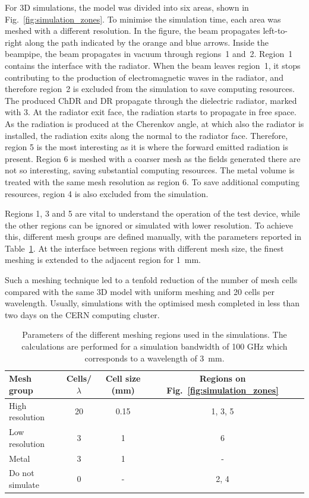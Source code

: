 For 3D simulations, the model was divided into six areas, shown in Fig.~\ref{fig:simulation_zones}. To minimise the simulation time, each area was meshed with a different resolution. In the figure, the beam propagates left-to-right along the path indicated by the orange and blue arrows. Inside the beampipe, the beam propagates in vacuum through regions~1 and~2. Region~1 contains the interface with the radiator. When the beam leaves region~1, it stops contributing to the production of electromagnetic waves in the radiator, and therefore region~2 is excluded from the simulation to save computing resources. The produced ChDR and DR propagate through the dielectric radiator, marked with 3. At the radiator exit face, the radiation starts to propagate in free space. As the radiation is produced at the Cherenkov angle, at which also the radiator is installed, the radiation exits along the normal to the radiator face. Therefore, region 5 is the most interesting as it is where the forward emitted radiation is present. Region 6 is meshed with a coarser mesh as the fields generated there are not so interesting, saving substantial computing resources. The metal volume is treated with the same mesh resolution as region 6. To save additional computing resources, region 4 is also excluded from the simulation. 

Regions 1, 3 and 5 are vital to understand the operation of the test device, while the other regions can be ignored or simulated with lower resolution. To achieve this, different mesh groups are defined manually, with the parameters reported in Table~\ref{tab:meshing}. At the interface between regions with different mesh size, the finest meshing is extended to the adjacent region for 1~mm. 

Such a meshing technique led to a tenfold reduction of the number of mesh cells compared with the same 3D model with uniform meshing and 20 cells per wavelength. Usually, simulations with the optimised mesh completed in less than two days on the CERN computing cluster. 





\begin{table}[!b]
  \centering
    \begin{tabular}{l c c c c}
    \toprule
    Mesh group &  Cells/$\lambda$ & Cell size (mm) & Regions on Fig.~\ref{fig:simulation_zones}\\
    \midrule
    High resolution     & 20    & 0.15  & 1, 3, 5\\
    Low resolution      & 3    & 1  & 6\\
    Metal               & 3    & 1  & -\\
    Do not simulate     & 0    & -  & 2, 4\\
    \bottomrule
    \end{tabular}
  \caption{Parameters of the different meshing regions used in the simulations. The calculations are performed for a simulation bandwidth of 100 GHz which corresponds to a wavelength of 3~mm.} \label{tab:meshing}
\end{table}


